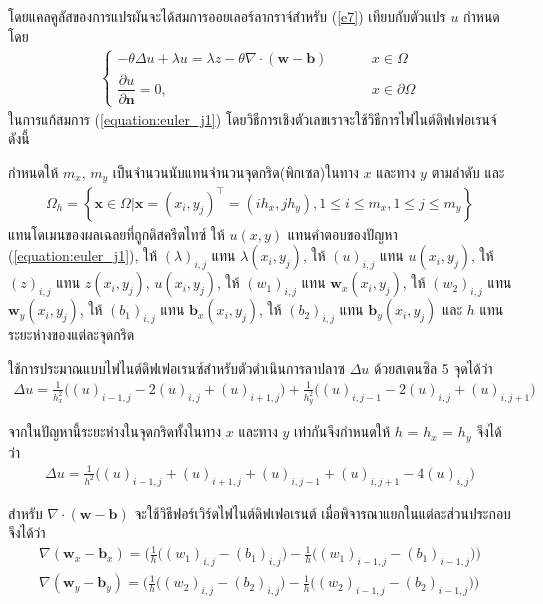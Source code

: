 \hspace{1cm}  โดยแคลคูลัสของการแปรผันจะได้สมการออยเลอร์ลากราจ์สำหรับ (\ref{e7}) เทียบกับตัวแปร $u$ กำหนดโดย
\begin{align}
\left \{ \begin{array}{ll}   - \theta \Delta u + \lambda u = \lambda z - \theta \nabla \cdot (\boldsymbol{w}-\boldsymbol{b}) & \hspace{1cm} x \in  \Omega 	 \\
 \dfrac{\partial u}{\partial \boldsymbol{n}} = 0, & \hspace{1cm} x \in \partial \Omega \end{array} \right . 
 \label{equation:euler_j1}
\end{align}
\hspace{1cm} ในการแก้สมการ (\ref{equation:euler_j1}) โดยวิธีการเชิงตัวเลขเราจะใช้วิธีการไฟไนต์ดิฟเฟอเรนจ์ดังนี้

\hspace{1cm} กำหนดให้ $m_x$, $m_y$ เป็นจำนวนนับแทนจำนวนจุดกริด(พิกเซล)ในทาง $x$ และทาง $y$ ตามลำดับ และ
\begin{align*}
	\Omega_{h}=\left\{ \mathbf{x} \in \Omega | \mathbf{x}=(x_i,y_j)^{\top} = (ih_x,jh_y), 1 \leq i \leq m_x, 1 \leq j \leq m_y  \right\}
\end{align*}
แทนโดเมนของผลเฉลยที่ถูกดิสครีตไทซ์ ให้ $u(x,y)$ แทนคำตอบของปัญหา  (\ref{equation:euler_j1}), ให้ $(\lambda)_{i,j}$ แทน $\lambda(x_i,y_j)$,   ให้ $(u)_{i,j}$ แทน $u(x_i,y_j)$, ให้ $(z)_{i,j}$ แทน $z(x_i,y_j)$, $u(x_i,y_j)$, ให้ $(w_1)_{i,j}$ แทน $\boldsymbol{w}_x(x_i,y_j)$, ให้ $(w_2)_{i,j}$ แทน $\boldsymbol{w}_y(x_i,y_j)$, ให้ $(b_1)_{i,j}$ แทน $\boldsymbol{b}_x(x_i,y_j)$, ให้ $(b_2)_{i,j}$ แทน $\boldsymbol{b}_y(x_i,y_j)$ และ $h$ แทนระยะห่างของแต่ละจุดกริด 

ใช้การประมาณแบบไฟไนต์ดิฟเฟอเรนซ์สำหรับตัวดำเนินการลาปลาซ $\Delta u$ ด้วยสเตนซิล 5 จุดได้ว่า
\begin{align}
	\Delta u = \frac{1}{h_x^2} \big( (u)_{i-1,j} - 2(u)_{i,j} + (u)_{i+1,j}\big) + \frac{1}{h_y^2} \big( (u)_{i,j-1} - 2(u)_{i,j} + (u)_{i,j+1}\big)
\end{align}

จากในปัญหานี้ระยะห่างในจุดกริดทั้งในทาง $x$ และทาง $y$ เท่ากันจึงกำหนดให้ $h$ = $h_x$ = $h_y$ จึงได้ว่า
\begin{align}
	\Delta u = \frac{1}{h^2} \big( (u)_{i-1,j} + (u)_{i+1,j} + (u)_{i,j-1} +  (u)_{i,j+1} - 4(u)_{i,j} \big)
\end{align}

สำหรับ $\nabla \cdot (\boldsymbol{w}-\boldsymbol{b})$ จะใช้วิธีฟอร์เวิร์ดไฟไนต์ดิฟเฟอเรนต์ เมื่อพิจารณาแยกในแต่ละส่วนประกอบจึงได้ว่า
\begin{align}
	\nabla (\boldsymbol{w}_x-\boldsymbol{b}_x)  = \bigg( \frac{1}{h} \Big((w_1)_{i,j}-(b_1)_{i,j}\Big) - \frac{1}{h} \Big((w_1)_{i-1,j}-(b_1)_{i-1,j}\Big) \bigg) \\ 
	\nabla (\boldsymbol{w}_y-\boldsymbol{b}_y)  = \bigg( \frac{1}{h} \Big((w_2)_{i,j}-(b_2)_{i,j}\Big) - \frac{1}{h} \Big((w_2)_{i-1,j}-(b_2)_{i-1,j}\Big) \bigg)
\end{align}

